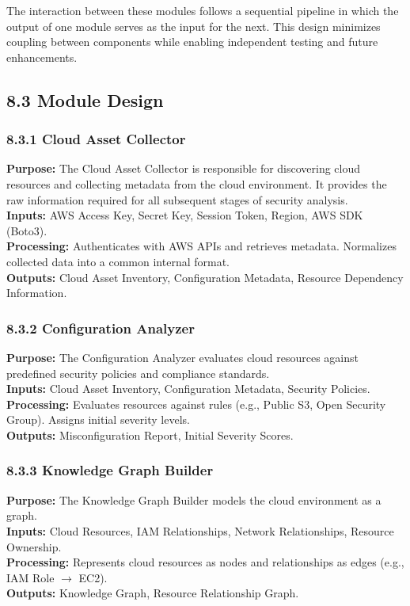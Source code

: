 The interaction between these modules follows a sequential pipeline in which the output of one module serves as the input for the next. This design minimizes coupling between components while enabling independent testing and future enhancements.

\subsection{8.3 Module Design}

\subsubsection{8.3.1 Cloud Asset Collector}

\textbf{Purpose:} The Cloud Asset Collector is responsible for discovering cloud resources and collecting metadata from the cloud environment. It provides the raw information required for all subsequent stages of security analysis.\\
\textbf{Inputs:} AWS Access Key, Secret Key, Session Token, Region, AWS SDK (Boto3).\\
\textbf{Processing:} Authenticates with AWS APIs and retrieves metadata. Normalizes collected data into a common internal format.\\
\textbf{Outputs:} Cloud Asset Inventory, Configuration Metadata, Resource Dependency Information.

\subsubsection{8.3.2 Configuration Analyzer}

\textbf{Purpose:} The Configuration Analyzer evaluates cloud resources against predefined security policies and compliance standards.\\
\textbf{Inputs:} Cloud Asset Inventory, Configuration Metadata, Security Policies.\\
\textbf{Processing:} Evaluates resources against rules (e.g., Public S3, Open Security Group). Assigns initial severity levels.\\
\textbf{Outputs:} Misconfiguration Report, Initial Severity Scores.

\subsubsection{8.3.3 Knowledge Graph Builder}

\textbf{Purpose:} The Knowledge Graph Builder models the cloud environment as a graph.\\
\textbf{Inputs:} Cloud Resources, IAM Relationships, Network Relationships, Resource Ownership.\\
\textbf{Processing:} Represents cloud resources as nodes and relationships as edges (e.g., IAM Role \(\rightarrow\) EC2).\\
\textbf{Outputs:} Knowledge Graph, Resource Relationship Graph.

